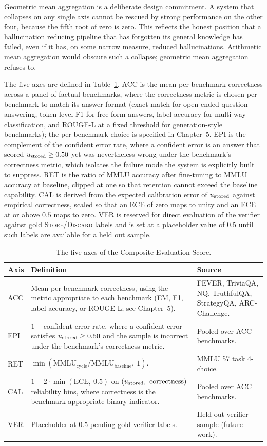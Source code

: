 Geometric mean aggregation is a deliberate design commitment. A system that collapses on any single axis cannot be rescued by strong performance on the other four, because the fifth root of zero is zero. This reflects the honest position that a hallucination reducing pipeline that has forgotten its general knowledge has failed, even if it has, on some narrow measure, reduced hallucinations. Arithmetic mean aggregation would obscure such a collapse; geometric mean aggregation refuses to.

The five axes are defined in Table~\ref{tab:ces-axes}. ACC is the mean per-benchmark correctness across a panel of factual benchmarks, where the correctness metric is chosen per benchmark to match its answer format (exact match for open-ended question answering, token-level F1 for free-form answers, label accuracy for multi-way classification, and ROUGE-L at a fixed threshold for generation-style benchmarks); the per-benchmark choice is specified in Chapter~5. EPI is the complement of the confident error rate, where a confident error is an answer that scored $u_{\text{stored}} \geq 0.50$ yet was nevertheless wrong under the benchmark's correctness metric, which isolates the failure mode the system is explicitly built to suppress. RET is the ratio of MMLU accuracy after fine-tuning to MMLU accuracy at baseline, clipped at one so that retention cannot exceed the baseline capability. CAL is derived from the expected calibration error of $u_{\text{stored}}$ against empirical correctness, scaled so that an ECE of zero maps to unity and an ECE at or above $0.5$ maps to zero. VER is reserved for direct evaluation of the verifier against gold \textsc{Store}/\textsc{Discard} labels and is set at a placeholder value of $0.5$ until such labels are available for a held out sample.

\begin{table}[H]
\centering
\caption{The five axes of the Composite Evaluation Score.}
\label{tab:ces-axes}
\small
\begin{tabular}{@{}p{1.2cm}p{6.0cm}p{6.4cm}@{}}
\toprule
\textbf{Axis} & \textbf{Definition} & \textbf{Source} \\
\midrule
ACC & Mean per-benchmark correctness, using the metric appropriate to each benchmark (EM, F1, label accuracy, or ROUGE-L; see Chapter~5). & FEVER, TriviaQA, NQ, TruthfulQA, StrategyQA, ARC-Challenge. \\
EPI & $1 - \text{confident error rate}$, where a confident error satisfies $u_{\text{stored}} \geq 0.50$ and the sample is incorrect under the benchmark's correctness metric. & Pooled over ACC benchmarks. \\
RET & $\min(\mathrm{MMLU}_{\text{cycle}} / \mathrm{MMLU}_{\text{baseline}},\ 1)$. & MMLU 57 task 4-choice. \\
CAL & $1 - 2 \cdot \min(\mathrm{ECE},\ 0.5)$ on $(u_{\text{stored}},\ \text{correctness})$ reliability bins, where correctness is the benchmark-appropriate binary indicator. & Pooled over ACC benchmarks. \\
VER & Placeholder at $0.5$ pending gold verifier labels. & Held out verifier sample (future work). \\
\bottomrule
\end{tabular}
\end{table}

